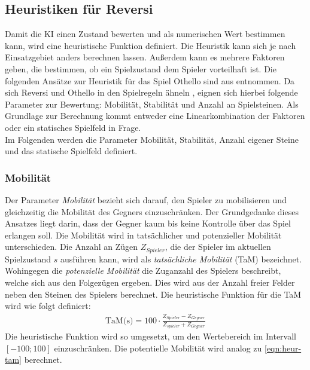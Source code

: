 \documentclass[12pt,a4paper,bibliography=totocnumbered,listof=totocnumbered]{article}
\begin{document}
\subsection{Heuristiken für Reversi} \label{sec:heuristik}
Damit die KI einen Zustand bewerten und als numerischen Wert bestimmen kann, wird eine heuristische Funktion definiert. Die Heuristik kann sich je nach Einsatzgebiet anders berechnen lassen. Außerdem kann es mehrere Faktoren geben, die bestimmen, ob ein Spielzustand dem Spieler vorteilhaft ist. Die folgenden Ansätze zur Heuristik für das Spiel Othello sind aus \citep{VaishnaviSannidhanam.2015} entnommen. Da sich Reversi und Othello in den Spielregeln ähneln \cite[S. 31]{Russell.2012}, eignen sich hierbei folgende Parameter zur Bewertung: Mobilität, Stabilität und Anzahl an Spielsteinen. Als Grundlage zur Berechnung kommt entweder eine Linearkombination der Faktoren oder ein statisches Spielfeld in Frage.\\
Im Folgenden werden die Parameter Mobilität, Stabilität, Anzahl eigener Steine und das statische Spielfeld definiert.

\subsubsection{Mobilität}
Der Parameter \emph{Mobilität} bezieht sich darauf, den Spieler zu mobilisieren und gleichzeitig die Mobilität des Gegners einzuschränken. Der Grundgedanke dieses Ansatzes liegt darin, dass der Gegner kaum bis keine Kontrolle über das Spiel erlangen soll. Die Mobilität wird in tatsächlicher und potenzieller Mobilität unterschieden. Die Anzahl an Zügen $Z_{Spieler}$, die der Spieler im aktuellen Spielzustand $s$ ausführen kann, wird als \emph{tatsächliche Mobilität} (TaM) bezeichnet. Wohingegen die \emph{potenzielle Mobilität} die Zuganzahl des Spielers beschreibt, welche sich aus den Folgezügen ergeben. Dies wird aus der Anzahl freier Felder neben den Steinen des Spielers berechnet. Die heuristische Funktion für die TaM wird wie folgt definiert:
\begin{align}
	\text{TaM(s)} = 100 \cdot \frac{Z_{Spieler} - Z_{Gegner}}{Z_{spieler} + Z_{Gegner}}
	\label{eqn:heur-tam}
\end{align}
Die heuristische Funktion wird so umgesetzt, um den Wertebereich im Intervall $[-100;100]$ einzuschränken. Die potentielle Mobilität wird analog zu \autoref{eqn:heur-tam} berechnet.
\end{document}
